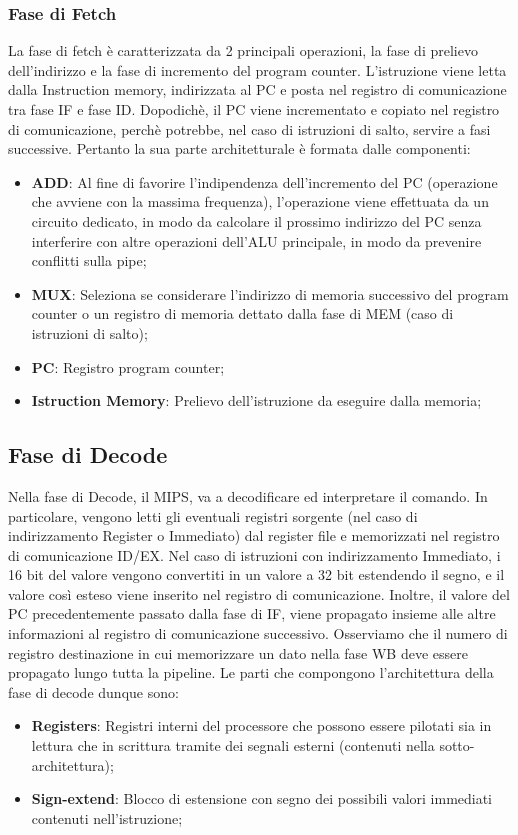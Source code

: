 \subsubsection{Fase di Fetch}
La fase di fetch è caratterizzata da 2 principali operazioni, la fase di prelievo dell'indirizzo e la fase di incremento del program counter. 
L'istruzione viene letta dalla Instruction memory, indirizzata al PC e posta nel registro di comunicazione tra fase IF e fase ID. Dopodichè, il PC viene incrementato e copiato nel registro di comunicazione, perchè potrebbe, nel caso di istruzioni di salto, servire a fasi successive.
Pertanto la sua parte architetturale è formata dalle componenti:
\begin{itemize}
    \item \textbf{ADD}: Al fine di favorire l'indipendenza dell'incremento del PC (operazione che avviene con la massima frequenza), l'operazione viene effettuata da un circuito dedicato, in modo da calcolare il prossimo indirizzo del PC senza interferire con altre operazioni dell'ALU principale, in modo da prevenire conflitti sulla pipe;
    \item \textbf{MUX}: Seleziona se considerare l'indirizzo di memoria successivo del program counter o un registro di memoria dettato dalla fase di MEM (caso di istruzioni di salto);
    \item \textbf{PC}: Registro program counter;
    \item \textbf{Istruction Memory}: Prelievo dell'istruzione da eseguire dalla memoria;
\end{itemize}

\subsection{Fase di Decode}
Nella fase di Decode, il MIPS, va a decodificare ed interpretare il comando. In particolare, vengono letti gli eventuali registri sorgente (nel caso di indirizzamento Register o Immediato) dal register file e memorizzati nel registro di comunicazione ID/EX. Nel caso di istruzioni con indirizzamento Immediato, i 16 bit del valore vengono convertiti in un valore a 32 bit estendendo il segno, e il valore così esteso viene inserito nel registro di comunicazione. Inoltre, il valore del PC precedentemente passato dalla fase di IF, viene propagato insieme alle altre informazioni al registro di comunicazione successivo. Osserviamo che il numero di registro destinazione in cui memorizzare un dato nella fase WB deve essere propagato lungo tutta la pipeline.
Le parti che compongono l'architettura della fase di decode dunque sono:
\begin{itemize}
    \item \textbf{Registers}: Registri interni del processore che possono essere pilotati sia in lettura che in scrittura tramite dei segnali esterni (contenuti nella sotto-architettura);
    \item \textbf{Sign-extend}: Blocco di estensione con segno dei possibili valori immediati contenuti nell'istruzione;
\end{itemize}

